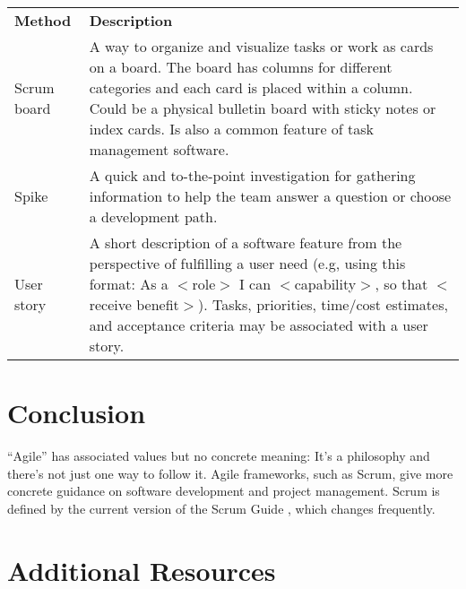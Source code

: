 \noindent\begin{tabular}{p{1.5in}|p{5in}}
\rowcolor{gray!35}
\textbf{Method} & \textbf{Description}\\
Scrum board\index{scrum board} & A way to organize and visualize tasks or work as cards on a board. The board has columns for different categories and each card is placed within a column. Could be a physical bulletin board with sticky notes or index cards. Is also a common feature of task management software.\\
Spike\index{spike} & A quick and to-the-point investigation for gathering information to help the team answer a question or choose a development path. \\
User story\index{user story} & A short description of a software feature from the perspective of fulfilling a user need (e.g, using this format: As a $<$role$>$ I can $<$capability$>$, so that $<$receive benefit$>$). Tasks, priorities, time/cost estimates, and acceptance criteria\index{acceptance criteria} may be associated with a user story.
\end{tabular}
\spacer

\section{Conclusion}
``Agile'' has associated values but no concrete meaning: It's a philosophy and there's not just one way to follow it. Agile frameworks, such as Scrum, give more concrete guidance on software development and project management. Scrum is defined by the current version of the Scrum Guide \parencite{schwaber2020scrum}, which changes frequently.

\section*{Additional Resources}

\begin{description}
    \item {}
    \item {}
    \item {}
    \item {}
    \item {}
    \item {}
    \item {}
\end{description}